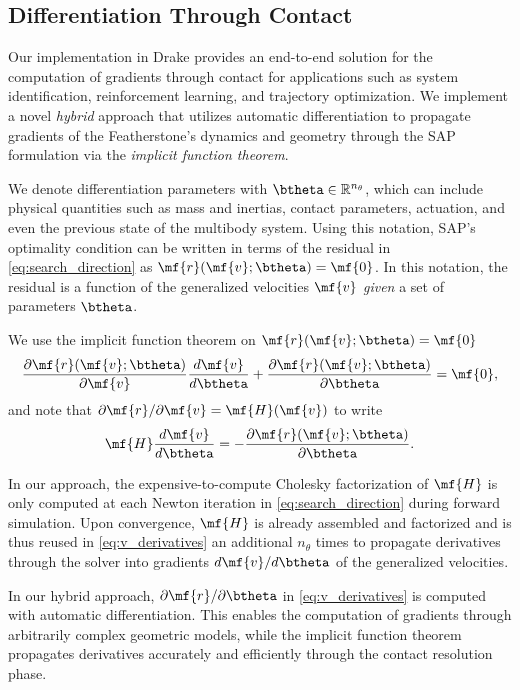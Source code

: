 \subsection{Differentiation Through Contact}
\label{sec:gradients}

Our implementation in Drake provides an end-to-end solution for the computation
of gradients through contact for applications such as system identification,
reinforcement learning, and trajectory optimization. We implement a novel
\emph{hybrid} approach that utilizes automatic differentiation to propagate
gradients of the Featherstone's dynamics and geometry through the SAP
formulation via the \emph{implicit function theorem}.

We denote differentiation parameters with $\btheta\in\mathbb{R}^{n_\theta}$,
which can include physical quantities such as mass and inertias, contact
parameters, actuation, and even the previous state of the multibody system.
Using this notation, SAP's optimality condition can be written in terms of the
residual in \eqref{eq:search_direction} as $\mf{r}(\mf{v}; \btheta) = \mf{0}$.
In this notation, the residual is a function of the
generalized velocities $\mf{v}$ \emph{given} a set of parameters $\btheta$.

We use the implicit function theorem on $\mf{r}(\mf{v}; \btheta) = \mf{0}$ 
\begin{equation*}
    \frac{\partial \mf{r}(\mf{v}; \btheta)}{\partial\mf{v}}\frac{d\mf{v}}{d\btheta} + \frac{\partial \mf{r}(\mf{v}; \btheta)}{\partial\btheta} = \mf{0},
\end{equation*}
and note that $\partial\mf{r}/\partial\mf{v}=\mf{H}(\mf{v})$ to write
\begin{equation}
    \mf{H}\frac{d\mf{v}}{d\btheta} = -\frac{\partial \mf{r}(\mf{v}; \btheta)}{\partial\btheta}.
    \label{eq:v_derivatives}
\end{equation}

In our approach, the expensive-to-compute Cholesky factorization of $\mf{H}$ is
only computed at each Newton iteration in \eqref{eq:search_direction} during
forward simulation. Upon convergence, $\mf{H}$ is already assembled and
factorized and is thus reused in \eqref{eq:v_derivatives} an additional
$n_\theta$ times to propagate derivatives through the solver into gradients
$d\mf{v}/d\btheta$ of the generalized velocities.

In our hybrid approach, $\partial\mf{r}/\partial\btheta$ in
\eqref{eq:v_derivatives} is computed with automatic differentiation. This
enables the computation of gradients through arbitrarily complex geometric
models, while the implicit function theorem propagates derivatives accurately
and efficiently through the contact resolution phase.
